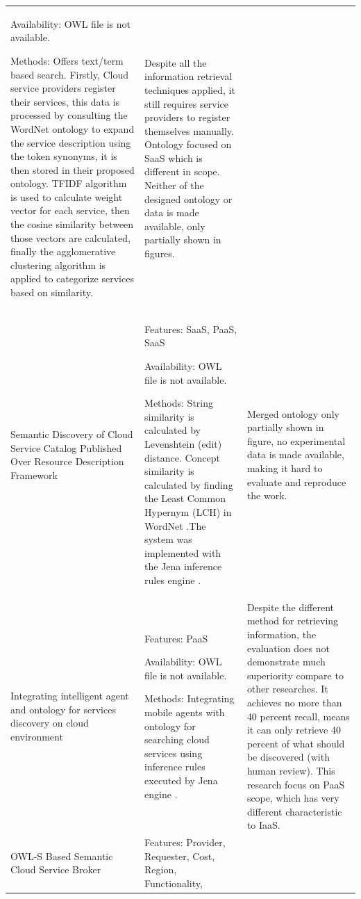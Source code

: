 \begin{longtable}[ht]{ p{.2\linewidth} p{.35\linewidth} p{.35\linewidth} }
    	Availability: OWL file is not available.
    	\bigskip
    	
    	Methods:
        Offers text/term based search. Firstly, Cloud service providers register their services, this data is  processed by consulting the WordNet \cite{WordNet} ontology to expand the service description using the token synonyms, it is  then stored in their proposed ontology. TFIDF algorithm is used to calculate weight vector for each service, then the cosine similarity between those vectors are calculated, finally the agglomerative clustering algorithm is applied to categorize services based on similarity.
        &
        Despite all the information retrieval techniques applied, it still requires service providers to register themselves manually. Ontology focused on SaaS which is different in scope. Neither of the designed ontology or data is made available, only partially shown in figures.
        \\
    	Semantic Discovery of Cloud Service Catalog Published Over Resource Description Framework \cite{Vasudevan2014SemanticDO} &
    	Features: SaaS, PaaS, SaaS
    	\bigskip
    	
    	Availability: OWL file is not available.
    	\bigskip
    	
    	Methods:
        String similarity is calculated by Levenshtein (edit) distance. Concept  similarity is calculated by finding the Least Common Hypernym (LCH) in WordNet \cite{WordNet}.The system was implemented with the Jena inference rules engine \cite{jena}.&
        Merged ontology only partially shown in figure, no experimental data is made available, making it hard to evaluate and reproduce the work.
        \\
    	Integrating intelligent agent and ontology for services discovery on cloud environment
        \cite{IntelligentAgentOntologyServicesDiscovery}
        &
        Features: PaaS
    	\bigskip
    	
    	Availability: OWL file is not available.
    	\bigskip
    	
    	Methods:
        Integrating mobile agents with ontology for searching cloud services
        using inference rules executed by Jena engine \cite{jena}.
        & 
        Despite the different method for retrieving information, the evaluation does not demonstrate much superiority compare to other researches. It achieves no more than 40 percent recall, means it can only retrieve 40 percent of what should be discovered (with human review).
        This research focus on PaaS scope, which has very different characteristic to IaaS.
        \\
    	OWL-S Based Semantic Cloud Service Broker \cite{OWL-CloudServiceBroker}
    	&
    	Features: Provider, Requester, Cost, Region, Functionality,  
    	\bigskip
    	

\end{longtable}

